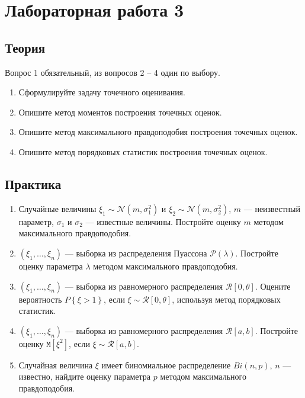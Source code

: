 \documentclass[a4paper,12pt]{article}
\newcommand{\expectation}[1]{\mathtt{M} \left[ #1 \right]}
\newcommand{\probability}[1]{P \left\{ #1 \right\}}
\begin{document}
\section*{Лабораторная работа 3}

\subsection*{Теория}

Вопрос 1 обязательный, из вопросов 2 -- 4 один по выбору.
\begin{enumerate}
      \item Сформулируйте задачу точечного оценивания.
      \item Опишите метод моментов построения точечных оценок.
      \item Опишите метод максимального правдоподобия построения точечных оценок.
      \item Опишите метод порядковых статистик построения точечных оценок.
\end{enumerate}

\subsection*{Практика}

\begin{enumerate}
      \item Случайные величины $\xi_1 \sim \mathcal{N} \left( m, \sigma_1^2 \right)$ и $\xi_2 \sim \mathcal{N} \left( m, \sigma_2^2 \right)$,
            $m$ --- неизвестный параметр, $\sigma_1$ и $\sigma_2$ --- известные величины. Постройте оценку $m$ методом максимального правдоподобия.

      \item $\left( \xi_1, \dots, \xi_n \right)$ --- выборка из распределения Пуассона $\mathcal{P}(\lambda)$. Постройте оценку
            параметра $\lambda$ методом максимального правдоподобия.

      \item $\left( \xi_1, \dots, \xi_n \right)$ --- выборка из равномерного распределения $\mathcal{R} \left[ 0, \theta \right]$.
            Оцените вероятность $\probability{\xi > 1}$, если $\xi \sim \mathcal{R} \left[ 0, \theta \right]$, используя метод
            порядковых статистик.

      \item $\left( \xi_1, \dots, \xi_n \right)$ --- выборка из равномерного распределения $\mathcal{R} \left[ a, b \right]$.
            Постройте оценку $\expectation{\xi^2}$, если $\xi \sim \mathcal{R} \left[ a, b \right]$.

      \item Случайная величина $\xi$ имеет биномиальное распределение $Bi \left(n, p \right)$, $n$ --- известно, найдите оценку
            параметра $p$ методом максимального правдоподобия.

\end{enumerate}
\end{document}
